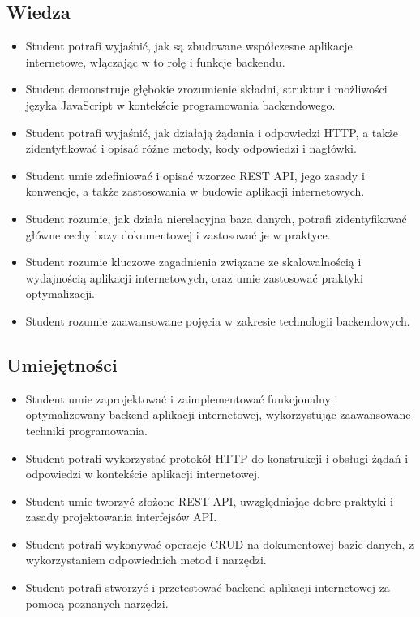 \documentclass[12pt, a4paper]{article}
\begin{document}
\subsection*{Wiedza}
\begin{itemize}
  \item Student potrafi wyjaśnić, jak są zbudowane współczesne aplikacje internetowe, włączając w to rolę i funkcje backendu.
  \item Student demonstruje głębokie zrozumienie składni, struktur i możliwości języka JavaScript w kontekście programowania backendowego.
  \item Student potrafi wyjaśnić, jak działają żądania i odpowiedzi HTTP, a także zidentyfikować i opisać różne metody, kody odpowiedzi i nagłówki.
  \item Student umie zdefiniować i opisać wzorzec REST API, jego zasady i konwencje, a także zastosowania w budowie aplikacji internetowych.
  \item Student rozumie, jak działa nierelacyjna baza danych, potrafi zidentyfikować główne cechy bazy dokumentowej i zastosować je w praktyce.
  \item Student rozumie kluczowe zagadnienia związane ze skalowalnością i wydajnością aplikacji internetowych, oraz umie zastosować praktyki optymalizacji.
  \item Student rozumie zaawansowane pojęcia w zakresie technologii backendowych.
\end{itemize}

\subsection*{Umiejętności}
\begin{itemize}
  \item Student umie zaprojektować i zaimplementować funkcjonalny i optymalizowany backend aplikacji internetowej, wykorzystując zaawansowane techniki programowania.
  \item Student potrafi wykorzystać protokół HTTP do konstrukcji i obsługi żądań i odpowiedzi w kontekście aplikacji internetowej.
  \item Student umie tworzyć złożone REST API, uwzględniając dobre praktyki i zasady projektowania interfejsów API.
  \item Student potrafi wykonywać operacje CRUD na dokumentowej bazie danych, z wykorzystaniem odpowiednich metod i narzędzi.
  \item Student potrafi stworzyć i przetestować backend aplikacji internetowej za pomocą poznanych narzędzi.
\end{itemize}
\end{document}
